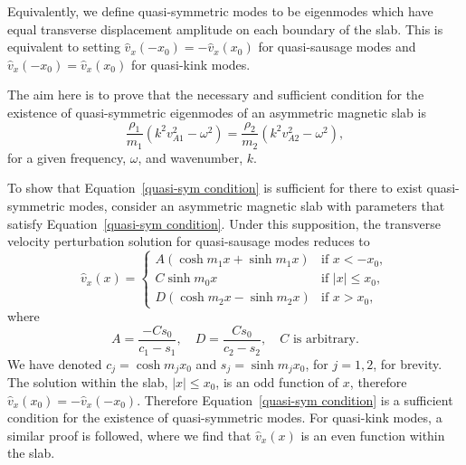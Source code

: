 \documentclass[12pt,draft]{../style-files/ociamthesis}
\begin{document}
Equivalently, we define quasi-symmetric modes to be eigenmodes which have equal transverse displacement amplitude on each boundary of the slab. This is equivalent to setting $\hat{v}_x (-x_0) = - \hat{v}_x (x_0)$ for quasi-sausage modes and $\hat{v}_x (-x_0) = \hat{v}_x (x_0)$ for quasi-kink modes.

The aim here is to prove that the necessary and sufficient condition for the existence of quasi-symmetric eigenmodes of an asymmetric magnetic slab is
\begin{equation}
\frac{\rho_1}{m_1}(k^2v_{A1}^2 - \omega^2) = \frac{\rho_2}{m_2}(k^2v_{A2}^2 - \omega^2), \label{quasi-sym condition}
\end{equation}
for a given frequency, $\omega$, and wavenumber, $k$.

To show that Equation~\eqref{quasi-sym condition} is sufficient for there to exist quasi-symmetric modes, consider an asymmetric magnetic slab with parameters that satisfy Equation~\eqref{quasi-sym condition}. Under this supposition, the transverse velocity perturbation solution for quasi-sausage modes reduces to
\begin{equation}
\hat{v}_x(x) =
\begin{cases}
A(\cosh{m_1x} + \sinh{m_1x}) & \text{if } x < -x_0, \\
C\sinh{m_0x} & \text{if } |x| \leq x_0, \\
D(\cosh{m_2x} - \sinh{m_2x}) & \text{if  } x > x_0,
\end{cases}
\end{equation}
where
\begin{equation}
A = \frac{-Cs_0}{c_1 - s_1}, \quad
D = \frac{Cs_0}{c_2 - s_2}, \quad
C \text{ is arbitrary}.
\end{equation}
We have denoted $c_j = \cosh{m_jx_0}$ and $s_j = \sinh{m_jx_0}$, for $j = 1, 2$, for brevity. The solution within the slab, $|x| \leq x_0$, is an odd function of $x$, therefore $\hat{v}_x(x_0) = -\hat{v}_x(-x_0)$. Therefore Equation~\eqref{quasi-sym condition} is a sufficient condition for the existence of quasi-symmetric modes. For quasi-kink modes, a similar proof is followed, where we find that $\hat{v}_x(x)$ is an even function within the slab.
\end{document}
